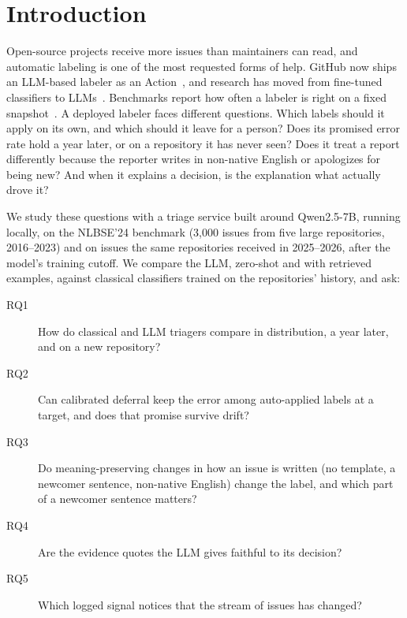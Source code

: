 \section{Introduction}

Open-source projects receive more issues than maintainers can read, and automatic labeling is one of
the most requested forms of help. GitHub now ships an LLM-based labeler as an
Action~\cite{github2025labeler}, and research has moved from fine-tuned classifiers to
LLMs~\cite{colavito2025issue,aracena2025issue}. Benchmarks report how often a labeler is right on a
fixed snapshot~\cite{nlbse24}. A deployed labeler faces different questions. Which labels should it
apply on its own, and which should it leave for a person? Does its promised error rate hold a year
later, or on a repository it has never seen? Does it treat a report differently because the reporter
writes in non-native English or apologizes for being new? And when it explains a decision, is the
explanation what actually drove it?

We study these questions with a triage service built around Qwen2.5-7B, running locally, on the
NLBSE'24 benchmark (3{,}000 issues from five large repositories, 2016--2023) and on issues the same
repositories received in 2025--2026, after the model's training cutoff. We compare the LLM, zero-shot
and with retrieved examples, against classical classifiers trained on the repositories' history, and
ask:
\begin{description}
\item[RQ1] How do classical and LLM triagers compare in distribution, a year later, and on a new
repository?
\item[RQ2] Can calibrated deferral keep the error among auto-applied labels at a target, and does
that promise survive drift?
\item[RQ3] Do meaning-preserving changes in how an issue is written (no template, a newcomer
sentence, non-native English) change the label, and which part of a newcomer sentence matters?
\item[RQ4] Are the evidence quotes the LLM gives faithful to its decision?
\item[RQ5] Which logged signal notices that the stream of issues has changed?
\end{description}

